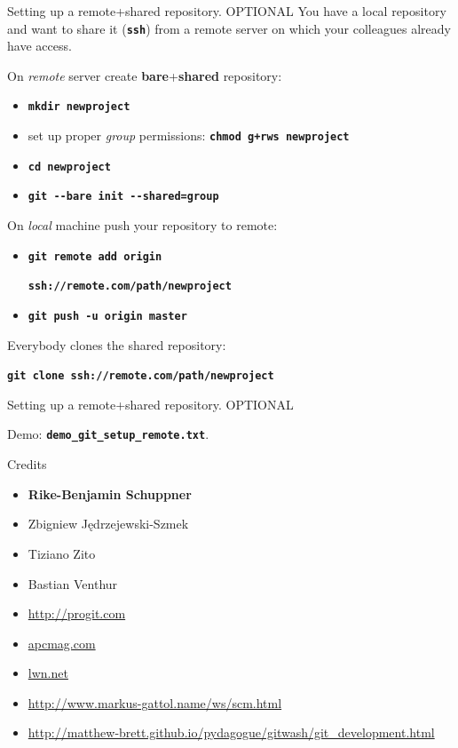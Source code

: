 \documentclass{beamer}
\begin{document}
\begin{frame}{Setting up a remote+shared repository. \alert{OPTIONAL}}
  You have a local repository and want to share it
  (\texttt{\textbf{ssh}}) from a remote server on which your
  colleagues already have access.
  \begin{block}{On \emph{remote} server create
      \textbf{bare}+\textbf{shared} repository:}
    \begin{itemize}
    \item \texttt{\textbf{mkdir newproject}}
    \item set up proper \emph{group} permissions: \texttt{\textbf{chmod g+rws newproject}}
    \item \texttt{\textbf{cd newproject}}
    \item \texttt{\textbf{git \alert{-{}-bare} init \alert{-{}-shared=group}}}
    \end{itemize}
  \end{block}
  \begin{block}{On \emph{local} machine push your repository to remote:}
    \begin{itemize}
    \item \texttt{\textbf{git remote add origin }}
          \begin{center}
            \texttt{\textbf{ssh://remote.com/path/newproject}}
      \end{center}
    \item \texttt{\textbf{git push \alert{-u} origin master}}
    \end{itemize}
  \end{block}
  Everybody clones the shared repository:
  \begin{center}
    \texttt{\textbf{git clone ssh://remote.com/path/newproject}}
  \end{center}
\end{frame}


\begin{frame}{Setting up a remote+shared repository. \alert{OPTIONAL}}
  \begin{center}
    Demo: \texttt{\textbf{demo\_git\_setup\_remote.txt}}.
  \end{center}
\end{frame}

\begin{frame}{Credits}
  \begin{itemize}
  \item \textbf{Rike-Benjamin Schuppner}
  \item Zbigniew J\k{e}drzejewski-Szmek
  \item Tiziano Zito
  \item Bastian Venthur
  \item \url{http://progit.com}
  \item \url{apcmag.com}
  \item \url{lwn.net}
  \item \url{http://www.markus-gattol.name/ws/scm.html}
  \item \url{http://matthew-brett.github.io/pydagogue/gitwash/git_development.html}
  \end{itemize}
\end{frame}
\end{document}
